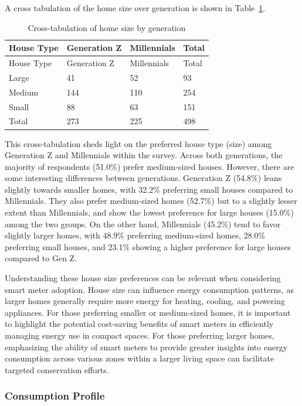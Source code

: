 \documentclass[
  letterpaper,
  DIV=11,
  numbers=noendperiod]{scrartcl}
\begin{document}
A cross tabulation of the home size over generation is shown in
Table~\ref{tbl-home-size-generation}.

\begin{longtable}[]{@{}llll@{}}
\caption{Cross-tabulation of home size by
generation}\label{tbl-home-size-generation}\tabularnewline
\toprule\noalign{}
House Type & Generation Z & Millennials & Total \\
\midrule\noalign{}
\endfirsthead
\toprule\noalign{}
House Type & Generation Z & Millennials & Total \\
\midrule\noalign{}
\endhead
\bottomrule\noalign{}
\endlastfoot
Large & 41 & 52 & 93 \\
Medium & 144 & 110 & 254 \\
Small & 88 & 63 & 151 \\
Total & 273 & 225 & 498 \\
\end{longtable}

This cross-tabulation sheds light on the preferred house type (size)
among Generation Z and Millennials within the survey. Across both
generations, the majority of respondents (51.0\%) prefer medium-sized
houses. However, there are some interesting differences between
generations. Generation Z (54.8\%) leans slightly towards smaller homes,
with 32.2\% preferring small houses compared to Millennials. They also
prefer medium-sized homes (52.7\%) but to a slightly lesser extent than
Millennials, and show the lowest preference for large houses (15.0\%)
among the two groups. On the other hand, Millennials (45.2\%) tend to
favor slightly larger homes, with 48.9\% preferring medium-sized homes,
28.0\% preferring small houses, and 23.1\% showing a higher preference
for large houses compared to Gen Z.

Understanding these house size preferences can be relevant when
considering smart meter adoption. House size can influence energy
consumption patterns, as larger homes generally require more energy for
heating, cooling, and powering appliances. For those preferring smaller
or medium-sized homes, it is important to highlight the potential
cost-saving benefits of smart meters in efficiently managing energy use
in compact spaces. For those preferring larger homes, emphasizing the
ability of smart meters to provide greater insights into energy
consumption across various zones within a larger living space can
facilitate targeted conservation efforts.

\subsubsection{Consumption Profile}\label{consumption-profile}
\end{document}
